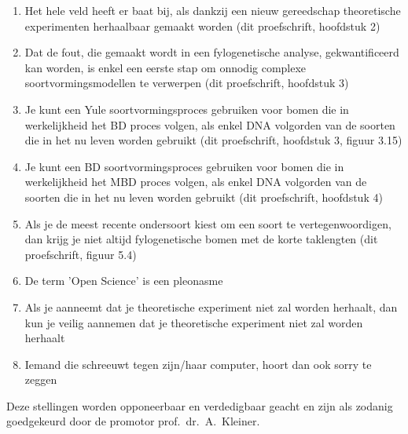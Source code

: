 \documentclass{propositions}
\begin{document}
{\begin{enumerate}
  \item Het hele veld heeft er baat bij, als dankzij een nieuw 
        gereedschap theoretische experimenten herhaalbaar gemaakt worden 
        (dit proefschrift, hoofdstuk 2)
  \item Dat de fout, die gemaakt wordt in een fylogenetische analyse,
        gekwantificeerd kan worden, is enkel een eerste
        stap om onnodig complexe soortvormingsmodellen te verwerpen
        (dit proefschrift, hoofdstuk 3)
  \item Je kunt een Yule soortvormingsproces gebruiken
        voor bomen die in werkelijkheid het BD proces volgen,
        als enkel DNA volgorden van de soorten die in het nu
        leven worden gebruikt 
        (dit proefschrift, hoofdstuk 3, figuur 3.15)
  \item Je kunt een BD soortvormingsproces gebruiken
        voor bomen die in werkelijkheid het MBD proces volgen,
        als enkel DNA volgorden van de soorten die in het nu
        leven worden gebruikt (dit proefschrift, hoofdstuk 4)
  \item Als je de meest recente ondersoort kiest om een soort te 
        vertegenwoordigen, dan krijg je niet altijd fylogenetische
        bomen met de korte taklengten (dit proefschrift, figuur 5.4)
  \item De term 'Open Science' is een pleonasme
  \item Als je aanneemt dat je theoretische experiment niet zal worden herhaalt,
        dan kun je veilig aannemen 
        dat je theoretische experiment niet zal worden herhaalt
  \item Iemand die schreeuwt tegen zijn/haar computer, hoort dan ook sorry te zeggen
\end{enumerate}

\bigskip
\bigskip

\begin{center}
Deze stellingen worden opponeerbaar en verdedigbaar geacht en zijn als zodanig goedgekeurd door de promotor prof.\ dr.\ A.\ Kleiner.
\end{center}

}
\end{document}
